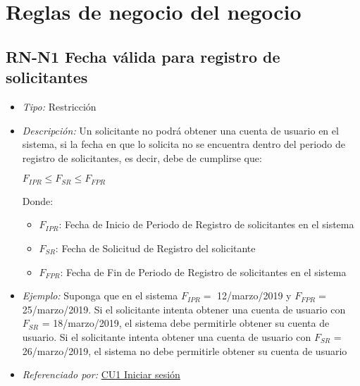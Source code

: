 
\pagebreak
\section{Reglas de negocio del negocio}

	\hypertarget{RN:N1:FechaValidaRS}{}
	\subsection{RN-N1 Fecha válida para registro de solicitantes}

		\begin{itemize}

			\item \textit{Tipo:} Restricción

			\item \textit{Descripción:} Un solicitante no podrá obtener una cuenta de usuario en el sistema, si la fecha en que lo solicita no se encuentra dentro del periodo de registro de solicitantes, es decir, debe de cumplirse que:\\

			\begin{center}
				$F_{IPR} \leq F_{SR} \leq F_{FPR} $
			\end{center}

			Donde:

			\begin{itemize}

				\item $F_{IPR}$: Fecha de Inicio de Periodo de Registro de solicitantes en el sistema

				\item $F_{SR}$: Fecha de Solicitud de Registro del solicitante

				\item $F_{FPR}$: Fecha de Fin de Periodo de Registro de solicitantes en el sistema

			\end{itemize} 

			\item \textit{Ejemplo:} Suponga que en el sistema $F_{IPR} =$ 12/marzo/2019 y $F_{FPR} =$ 25/marzo/2019. Si el solicitante intenta obtener una cuenta de usuario con $F_{S R}$ = 18/marzo/2019, el sistema debe permitirle obtener su cuenta de usuario. Si el solicitante intenta obtener una cuenta de usuario con $F_{SR}$ = 26/marzo/2019, el sistema no debe permitirle obtener su cuenta de usuario

			\item \textit{Referenciado por:} \hyperlink{CU1}{CU1 Iniciar sesión}

		\end{itemize}

